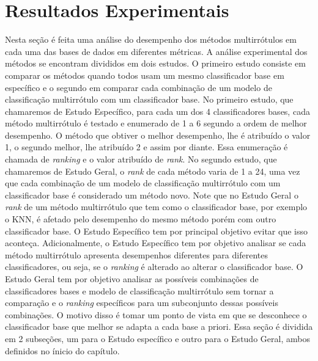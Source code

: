 

% 


\section{Resultados Experimentais}
\label{sec:exps}
Nesta seção é feita uma análise do desempenho dos métodos multirrótulos em cada uma das bases de dados
em diferentes métricas.
A análise experimental dos métodos se encontram divididos em dois estudos.
O primeiro estudo consiste em
comparar os métodos quando todos usam um mesmo classificador base em específico
e o segundo em comparar cada combinação de um
modelo de classificação multirrótulo com um classificador base. 
No primeiro estudo, que chamaremos de Estudo Específico, para cada um dos 4 classificadores bases, 
cada método multirrótulo é 
testado e enumerado de 1 a 6 segundo a ordem de melhor desempenho.
O método que obtiver o melhor desempenho, lhe é atribuído o valor 1,
o segundo melhor, lhe atribuído 2 e assim por diante.
Essa enumeração é chamada de \textit{ranking} e o valor atribuído de \textit{rank}.
No segundo estudo,
que chamaremos de Estudo Geral,
o \textit{rank} de cada método varia de 1 a 24, 
uma vez que cada
combinação de um modelo de classificação multirrótulo com um classificador base
é considerado um método novo.
Note que no Estudo Geral
o \textit{rank} de um método multirrótulo que tem como o classificador base, por exemplo o KNN,
é afetado pelo desempenho do mesmo método porém com outro classificador base.
O Estudo Específico
tem por principal objetivo evitar que isso aconteça.
Adicionalmente, o Estudo Específico tem por objetivo
analisar se cada método multirrótulo
apresenta desempenhos diferentes para
diferentes classificadores, ou seja, se o \textit{ranking} é alterado ao alterar o classificador base.
O Estudo Geral
tem por objetivo analisar as possíveis combinações de classificadores bases e modelo de classificação multirrótulo
sem tornar a comparação e o \textit{ranking} específicos
para um subconjunto dessas possíveis combinações.
O motivo disso é tomar um ponto de vista em que se desconhece
o classificador base que melhor se adapta a cada base a priori.
Essa seção é dividida em 2 subseções, um para o Estudo específico e
outro para o Estudo Geral, ambos definidos no ínicio do capítulo.

